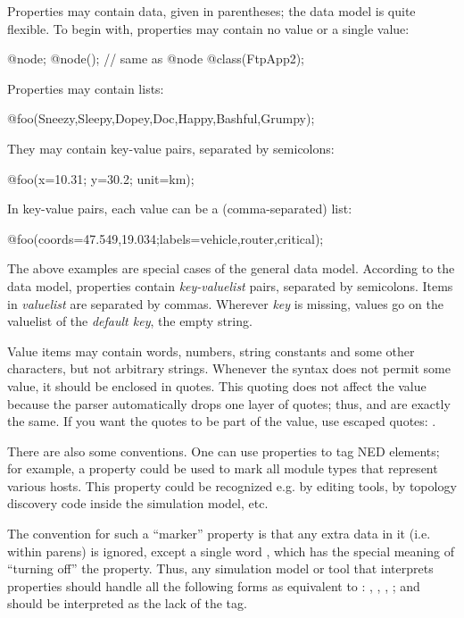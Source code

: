 Properties may contain data, given in parentheses; the data model is quite
flexible. To begin with, properties may contain no value or a single
value:

\begin{ned}
@node;
@node(); // same as @node
@class(FtpApp2);
\end{ned}

Properties may contain lists:

\begin{ned}
@foo(Sneezy,Sleepy,Dopey,Doc,Happy,Bashful,Grumpy);
\end{ned}

They may contain key-value pairs, separated by semicolons:

\begin{ned}
@foo(x=10.31; y=30.2; unit=km);
\end{ned}

In key-value pairs, each value can be a (comma-separated) list:

\begin{ned}
@foo(coords=47.549,19.034;labels=vehicle,router,critical);
\end{ned}

The above examples are special cases of the general data model. According
to the data model, properties contain \textit{key-valuelist} pairs,
separated by semicolons. Items in \textit{valuelist} are separated by
commas. Wherever \textit{key} is missing, values go on the valuelist of the
\textit{default key}, the empty string.

Value items may contain words, numbers, string constants and some other
characters, but not arbitrary strings.
Whenever the syntax does not permit some value, it should be enclosed in
quotes. This quoting does not affect the value because
the parser automatically drops one layer of quotes; thus, 
and  are exactly the same. If you want the quotes
to be part of the value, use escaped quotes:
.

There are also some conventions. One can use properties to tag NED
elements; for example, a  property could be used to mark all
module types that represent various hosts. This property could be
recognized e.g. by editing tools, by topology discovery code inside the
simulation model, etc.

The convention for such a ``marker'' property is that any extra data in it
(i.e. within parens) is ignored, except a single word , which has
the special meaning of ``turning off'' the property. Thus, any simulation model
or tool that interprets properties should handle all the following forms as
equivalent to : , ,
, ; and
 should be interpreted as the lack of the 
tag.


